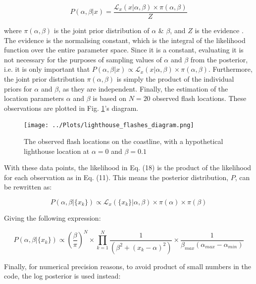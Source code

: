 \documentclass[12pt]{report} %
\begin{document}
\begin{equation}
    P(\alpha, \beta | x) = \frac{\mathcal{L}_{x}(x | \alpha, \beta) \times \pi(\alpha,\beta)}{Z}
\end{equation}

where $\pi(\alpha,\beta)$ is the joint prior distribution of $\alpha$ \& $\beta$, and $Z$ is the evidence \cite[p.6]{sivia_data_analysis}. The evidence is the normalising constant, which is the integral of the likelihood function over the entire parameter space\cite{knuth_bayesian_evidence}\cite{slideserve_bayesian_evidence}. Since it is a constant, evaluating it is not necessary for the purposes of sampling values of $\alpha$ and $\beta$ from the posterior, i.e. it is only important that $P(\alpha, \beta | x) \propto \mathcal{L}_{x}(x | \alpha, \beta) \times \pi(\alpha,\beta)$. Furthermore, the joint prior distribution $\pi(\alpha,\beta)$ is simply the product of the individual priors for $\alpha$ and $\beta$, as they are independent. Finally, the estimation of the location parameters $\alpha$ and $\beta$ is based on $N = 20$ observed flash locations. These observations are plotted in Fig. \ref{fig:observations}'s diagram.

\begin{figure}[h]
\centering
\texttt{[image: ../Plots/lighthouse\_flashes\_diagram.png]}
\caption{The observed flash locations on the coastline, with a hypothetical lighthouse location at $\alpha = 0$ and $\beta = 0.1$}
\label{fig:observations}
\end{figure}

\newpage

With these data points, the likelihood in Eq. (18) is the product of the likelihood for each observation as in Eq. (11). This means the posterior distribution, $P$, can be rewritten as:

\begin{equation}
    P(\alpha, \beta | \{x_{k}\}) \propto \mathcal{L}_{x}(\{x_{k}\} | \alpha, \beta) \times \pi(\alpha) \times \pi(\beta)
\end{equation}

Giving the following expression:

\begin{equation}
    P(\alpha, \beta | \{x_{k}\}) \propto (\frac{\beta}{\pi})^{N} \times \prod_{k=1}^{N}\frac{1}{(\beta^{2} + (x_{k} - \alpha)^{2})} \times \frac{1}{\beta_{max}(\alpha_{max} - \alpha_{min})}
\end{equation}

Finally, for numerical precision reasons, to avoid product of small numbers in the code, the log posterior is used instead:
\end{document}
